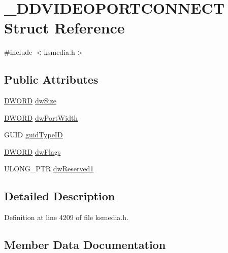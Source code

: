 \hypertarget{struct___d_d_v_i_d_e_o_p_o_r_t_c_o_n_n_e_c_t}{}\section{\+\_\+\+D\+D\+V\+I\+D\+E\+O\+P\+O\+R\+T\+C\+O\+N\+N\+E\+CT Struct Reference}
\label{struct___d_d_v_i_d_e_o_p_o_r_t_c_o_n_n_e_c_t}


{\ttfamily \#include $<$ksmedia.\+h$>$}

\subsection*{Public Attributes}
\begin{DoxyCompactItemize}
\item 
\hyperlink{mapinls_8h_ad342ac907eb044443153a22f964bf0af}{D\+W\+O\+RD} \hyperlink{struct___d_d_v_i_d_e_o_p_o_r_t_c_o_n_n_e_c_t_aa971e4d7fb8cb2fea4aeb6504da13e77}{dw\+Size}
\item 
\hyperlink{mapinls_8h_ad342ac907eb044443153a22f964bf0af}{D\+W\+O\+RD} \hyperlink{struct___d_d_v_i_d_e_o_p_o_r_t_c_o_n_n_e_c_t_ad4cb62df3693142f236bf69742b2b8d3}{dw\+Port\+Width}
\item 
G\+U\+ID \hyperlink{struct___d_d_v_i_d_e_o_p_o_r_t_c_o_n_n_e_c_t_aac0f8ec595f52384aaadca7b7a676fbb}{guid\+Type\+ID}
\item 
\hyperlink{mapinls_8h_ad342ac907eb044443153a22f964bf0af}{D\+W\+O\+RD} \hyperlink{struct___d_d_v_i_d_e_o_p_o_r_t_c_o_n_n_e_c_t_a1d83c421a5d928155295696e8b9d846c}{dw\+Flags}
\item 
U\+L\+O\+N\+G\+\_\+\+P\+TR \hyperlink{struct___d_d_v_i_d_e_o_p_o_r_t_c_o_n_n_e_c_t_a7ba957276be10a8994481abcecc00bcd}{dw\+Reserved1}
\end{DoxyCompactItemize}


\subsection{Detailed Description}


Definition at line 4209 of file ksmedia.\+h.



\subsection{Member Data Documentation}
